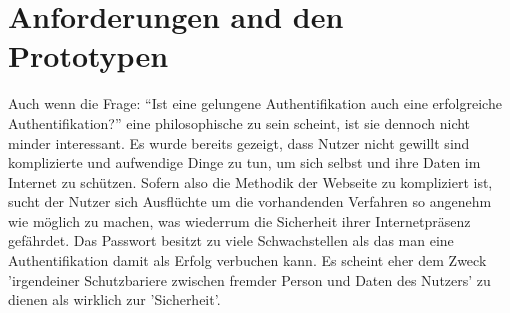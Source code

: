 \section{Anforderungen and den Prototypen}
Auch wenn die Frage: ``Ist eine gelungene Authentifikation auch eine erfolgreiche Authentifikation?'' eine philosophische zu sein scheint, ist sie dennoch nicht minder interessant. Es wurde bereits gezeigt, dass Nutzer nicht gewillt sind komplizierte und aufwendige Dinge zu tun, um sich selbst und ihre Daten im Internet zu schützen. Sofern also die Methodik der Webseite zu kompliziert ist, sucht der Nutzer sich Ausflüchte um die vorhandenden Verfahren so angenehm wie möglich zu machen, was wiederrum die Sicherheit ihrer Internetpräsenz gefährdet. Das Passwort besitzt zu viele Schwachstellen als das man eine Authentifikation damit als Erfolg verbuchen kann. Es scheint eher dem Zweck 'irgendeiner Schutzbariere zwischen fremder Person und Daten des Nutzers' zu dienen als wirklich zur 'Sicherheit'.

